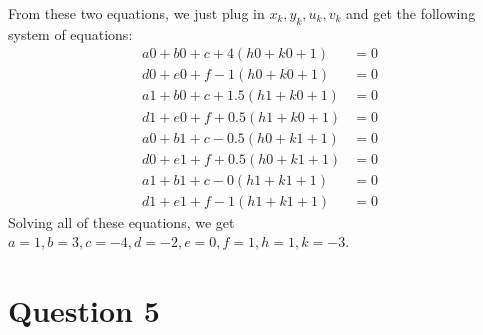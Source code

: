 \documentclass{article} %
\begin{document}
From these two equations, we just plug in $x_k, y_k, u_k, v_k$ and get the following system of equations:
\begin{align*}
a 0 + b 0 + c + 4 (h 0 + k 0 + 1) &= 0\\
d 0 + e 0 + f - 1 (h 0 + k 0 + 1) &= 0\\
a 1 + b 0 + c + 1.5 (h 1 + k 0 + 1) &= 0 \\
d 1 + e 0 + f + 0.5 (h 1 + k 0 + 1) &= 0\\
a 0 + b 1 + c - 0.5 (h 0 + k 1 + 1) &= 0\\
d 0 + e 1 + f + 0.5 (h 0 + k 1 + 1) &= 0\\
a 1 + b 1 + c - 0 (h 1 + k 1 + 1) &= 0\\
d 1 + e 1 + f - 1 (h 1 + k 1 + 1) &= 0
\end{align*}
Solving all of these equations, we get $a = 1, b = 3, c = -4, d = -2, e = 0, f = 1, h=1, k=-3$.


\section{Question 5}
\end{document}
